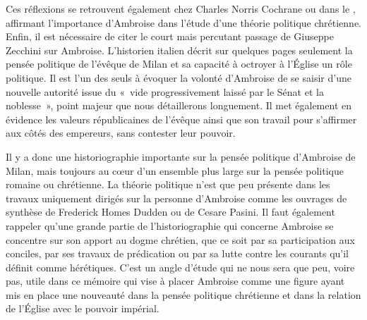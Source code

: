 \bigskip

Ces réflexions se retrouvent également chez Charles Norris Cochrane\autocite{cochrane_christianity} ou dans le \autocite{rowe_history}, affirmant l'importance d'Ambroise dans l'étude d'une théorie politique chrétienne. Enfin, il est nécessaire de citer le court mais percutant passage de Giuseppe Zecchini sur Ambroise\autocite{zecchini_pensiero_politico}. L'historien italien décrit sur quelques pages seulement la pensée politique de l'évêque de Milan et sa capacité à octroyer à l'Église un rôle politique. Il est l'un des seuls à évoquer la volonté d'Ambroise de se saisir d'une nouvelle autorité issue du «~vide progressivement laissé par le Sénat et la noblesse~», point majeur que nous détaillerons longuement. Il met également en évidence les valeurs républicaines de l'évêque ainsi que son travail pour s'affirmer aux côtés des empereurs, sans contester leur pouvoir.

\bigskip

Il y a donc une historiographie importante sur la pensée politique d'Ambroise de Milan, mais toujours au cœur d'un ensemble plus large sur la pensée politique romaine ou chrétienne. La théorie politique n'est que peu présente dans les travaux uniquement dirigés sur la personne d'Ambroise comme les ouvrages de synthèse de Frederick Homes Dudden\autocite{dudden_life} ou de Cesare Pasini\autocite{pasini_ambrose}. Il faut également rappeler qu'une grande partie de l'historiographie qui concerne Ambroise se concentre sur son apport au dogme chrétien, que ce soit par sa participation aux conciles, par ses travaux de prédication ou par sa lutte contre les courants qu'il définit comme hérétiques. C'est un angle d'étude qui ne nous sera que peu, voire pas, utile dans ce mémoire qui vise à placer Ambroise comme une figure ayant mis en place une nouveauté dans la pensée politique chrétienne et dans la relation de l'Église avec le pouvoir impérial.

\bigskip

